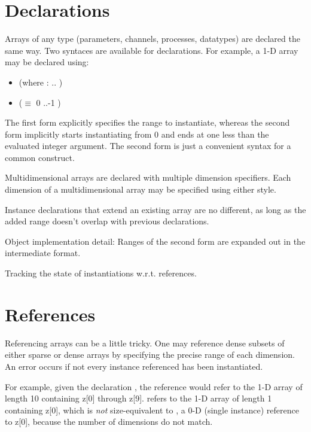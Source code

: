 \section{Declarations}
\label{sec:arrays:declarations}

Arrays of any type (parameters, channels, processes, datatypes) 
are declared the same way.  
Two syntaces are available for declarations. 
For example, a 1-D array may be declared using:
\begin{itemize}
\item {} \ttt{[}  \ttt{]} \hfill
	(where  :  .. )
\item {} \ttt{[}  \ttt{]} \hfill
	($\equiv$  \ttt{[} 0 ..-1 \ttt{]})
\end{itemize}
The first form explicitly specifies the range to instantiate, 
whereas the second form implicitly starts instantiating from 0 and 
ends at one less than the evaluated integer argument.  
The second form is just a convenient syntax for a common construct.  

Multidimensional arrays are declared with multiple dimension specifiers.  
Each dimension of a multidimensional array may be specified using
either style.  

Instance declarations that extend an existing array are no different, 
as long as the added range doesn't overlap with previous declarations.  

Object implementation detail:
Ranges of the second form are expanded out in the intermediate format.  

Tracking the state of instantiations w.r.t. references.  

\section{References}
\label{sec:arrays:references}

Referencing arrays can be a little tricky.  
One may reference dense subsets of either sparse or dense arrays
by specifying the precise range of each dimension.  
An error occurs if not every instance referenced has been instantiated.  

For example, given the declaration , 
the reference  would refer to the
1-D array of length 10 containing z[0] through z[9].  
 refers to the 1-D array of length 1 containing z[0], 
which is \emph{not} size-equivalent to , 
a 0-D (single instance) reference to z[0], 
because the number of dimensions do not match.  

